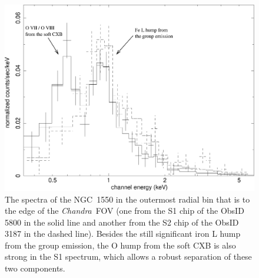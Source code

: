 \documentclass{aastex}
\def\chandra    {{\em Chandra}\/}
\begin{document}
\clearpage

\begin{figure}
\centerline{\includegraphics[height=0.4\linewidth]{f1.eps}}
  \caption{The spectra of the NGC~1550 in the outermost radial bin that is to the edge
of the \chandra\ FOV (one from the S1 chip of the ObsID 5800 in the solid line and
another from the S2 chip of the ObsID 3187 in the dashed line). Besides the still
significant iron L hump from the group emission, the O hump from the soft CXB is also
strong in the S1 spectrum, which allows a robust separation of these two components.
}
\end{figure}
\end{document}
